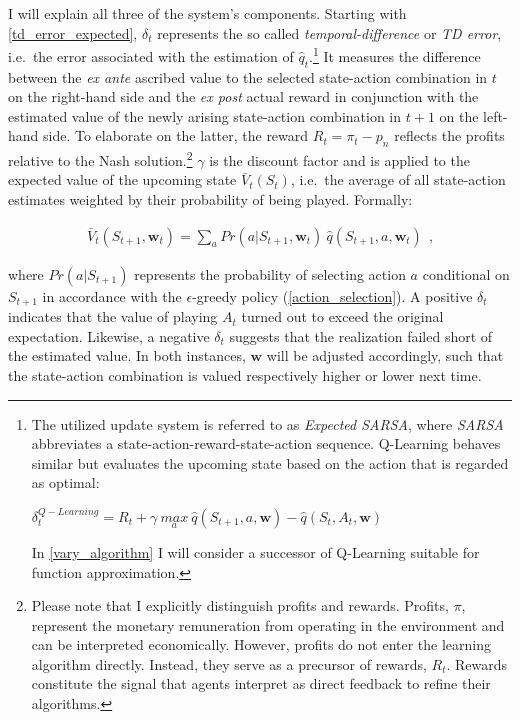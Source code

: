 I will explain all three of the system's components. Starting with \autoref{td_error_expected}, $\delta_t$ represents the so called \emph{temporal-difference} or \emph{TD error}, i.e.\ the error associated with the estimation of $\hat{q}_t$.\footnote{The utilized update system is referred to as \emph{Expected SARSA}, where \emph{SARSA} abbreviates a state-action-reward-state-action sequence. Q-Learning behaves similar but evaluates the upcoming state based on the action that is regarded as optimal:
	\begin{center}
		$\delta_t^{Q-Learning} = R_t + \gamma ~ \underset{a}{max} ~ \hat{q}(S_{t+1}, a, \boldsymbol{w}) - \hat{q}(S_t, A_t, \boldsymbol{w})$
	\end{center}
	In \autoref{vary_algorithm} I will consider a successor of Q-Learning suitable for function approximation.} It measures the difference between the \emph{ex ante} ascribed value to the selected state-action combination in $t$ on the right-hand side and the \emph{ex post} actual reward in conjunction with the estimated value of the newly arising state-action combination in $t+1$ on the left-hand side. To elaborate on the latter, the reward $R_t = \pi_t - p_n$ reflects the profits relative to the Nash solution.\footnote{Please note that I explicitly distinguish profits and rewards. Profits, $\pi$, represent the monetary remuneration from operating in the environment and can be interpreted economically. However, profits do not enter the learning algorithm directly. Instead, they serve as a precursor of rewards, $R_t$. Rewards constitute the signal that agents interpret as direct feedback to refine their algorithms.} $\gamma$ is the discount factor and is applied to the expected value of the upcoming state $\bar{V}_t(S_t)$, i.e.\ the average of all state-action estimates weighted by their probability of being played. Formally:

\begin{gather}\label{expected_state_value}
\bar{V}_t(S_{t+1}, \boldsymbol{w}_t) = \sum_{a} Pr(a|S_{t+1}, \boldsymbol{w}_t) ~ \hat{q}(S_{t+1}, a, \boldsymbol{w}_t) ~~   \text{,}
\end{gather}

where $Pr(a|S_{t+1})$ represents the probability of selecting action $a$ conditional on $S_{t+1}$ in accordance with the $\epsilon$-greedy policy (\autoref{action_selection}). A positive $\delta_t$ indicates that the value of playing $A_t$ turned out to exceed the original expectation. Likewise, a negative $\delta_t$ suggests that the realization failed short of the estimated value. In both instances, $\boldsymbol{w}$ will be adjusted accordingly, such that the state-action combination is valued respectively higher or lower next time.

